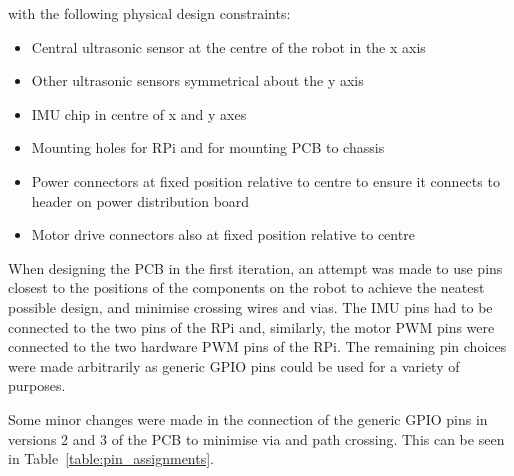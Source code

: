 with the following physical design constraints:

\begin{itemize}
  \item Central ultrasonic sensor at the centre of the robot in the x axis
  \item Other ultrasonic sensors symmetrical about the y axis
  \item IMU chip in centre of x and y axes
  \item Mounting holes for RPi and for mounting PCB to chassis
  \item Power connectors at fixed position relative to centre to ensure it
  connects to header on power distribution board
  \item Motor drive connectors also at fixed position relative to centre
\end{itemize}

When designing the PCB in
the first iteration, an attempt was made to use pins closest to the positions
of the components on the robot to achieve the neatest possible design, and minimise
crossing wires and vias. The IMU pins had to be connected to the two \isc{}
pins of the RPi and, similarly, the motor PWM pins were
connected to the two hardware PWM pins of the RPi. The remaining pin choices
were made arbitrarily as generic GPIO pins could be used for a variety of purposes.

Some minor changes were made in the connection of the generic GPIO pins in versions 2 and 3 of the PCB to minimise
via and path crossing. This can be seen in Table~\ref{table:pin_assignments}.

